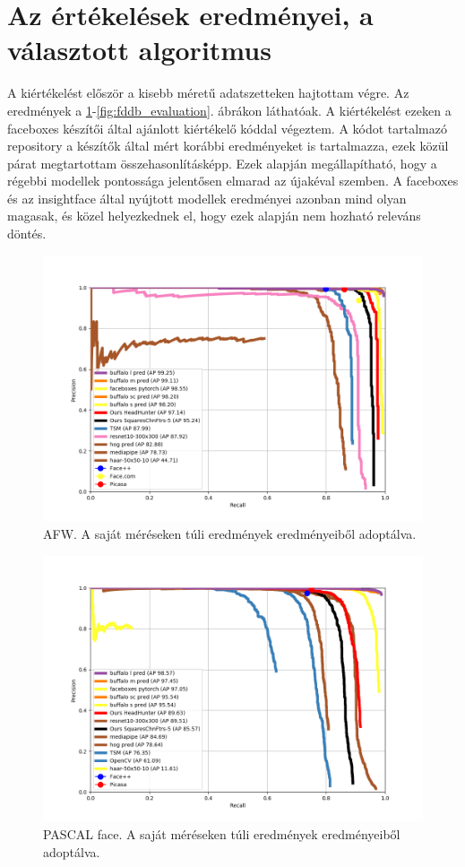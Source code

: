 \section{Az értékelések eredményei, a választott algoritmus}
A kiértékelést először a kisebb méretű adatszetteken hajtottam végre. Az eredmények a \ref{fig:afw_evaluation}-\ref{fig:fddb_evaluation}. ábrákon láthatóak. A kiértékelést ezeken a faceboxes készítői által ajánlott kiértékelő kóddal végeztem. A kódot tartalmazó repository a készítők által mért korábbi eredményeket is tartalmazza, ezek közül párat megtartottam összehasonlításképp. Ezek alapján megállapítható, hogy a régebbi modellek pontossága jelentősen elmarad az újakéval szemben. A faceboxes és az insightface által nyújtott modellek eredményei azonban mind olyan magasak, és közel helyezkednek el, hogy ezek alapján nem hozható releváns döntés.
\begin{figure}
    \centering
    \includegraphics[width=\linewidth]{figures/afw.png}
    \caption{AFW. A saját méréseken túli eredmények \cite{zhang_face_eval_2021} eredményeiből adoptálva.}
    \label{fig:afw_evaluation}
\end{figure}
\begin{figure}
    \centering
    \includegraphics[width=\linewidth]{figures/pascal.png}
    \caption{PASCAL face. A saját méréseken túli eredmények \cite{zhang_face_eval_2021} eredményeiből adoptálva.}
    \label{fig:pascal_evaluation}
\end{figure}
